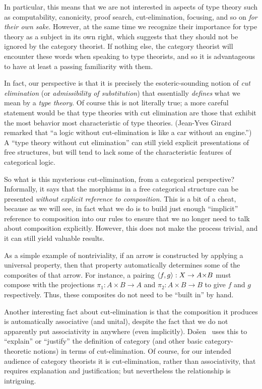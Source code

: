 In particular, this means that we are not interested in aspects of type theory such as computability, canonicity, proof search, cut-elimination, focusing, and so on \emph{for their own sake}.
However, at the same time we recognize their importance for type theory as a subject in its own right, which suggests that they should not be ignored by the category theorist.
If nothing else, the category theorist will encounter these words when speaking to type theorists, and so it is advantageous to have at least a passing familiarity with them.

In fact, our perspective is that it is precisely the esoteric-sounding notion of \emph{cut elimination} (or \emph{admissibility of substitution}) that essentially \emph{defines} what we mean by a \emph{type theory}.
Of course this is not literally true; a more careful statement would be that type theories with cut elimination are those that exhibit the most behavior most characteristic of type theories.
(Jean-Yves Girard remarked that ``a logic without cut-elimination is like a car without an engine.'')
A ``type theory without cut elimination'' can still yield explicit presentations of free structures, but will tend to lack some of the characteristic features of categorical logic.

So what is this mysterious cut-elimination, from a categorical perspective?
Informally, it says that the morphisms in a free categorical structure can be presented \emph{without explicit reference to composition}.
This is a bit of a cheat, because as we will see, in fact what we do is to build just enough ``implicit'' reference to composition into our rules to ensure that we no longer need to talk about composition explicitly.
However, this does not make the process trivial, and it can still yield valuable results.

As a simple example of nontriviality, if an arrow is constructed by applying a universal property, then that property automatically determines some of the composites of that arrow.
For instance, a pairing $\pair{f}{g}:X\to A\times B$ must compose with the projections $\pi_1:A\times B\to A$ and $\pi_2:A\times B\to B$ to give $f$ and $g$ respectively.
Thus, these composites do not need to be ``built in'' by hand.

Another interesting fact about cut-elimination is that the composition it produces is automatically associative (and unital), despite the fact that we do not apparently put associativity in anywhere (even implicitly).
Do\v{s}en~\cite{dosen:cutelim-cats} %
 uses this to ``explain'' or ``justify'' the definition of category (and other basic category-theoretic notions) in terms of cut-elimination.
Of course, for our intended audience of category theorists it is cut-elimination, rather than associativity, that requires explanation and justification; but nevertheless the relationship is intriguing.

